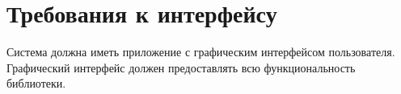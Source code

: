 \section{Требования к интерфейсу}
Система должна иметь приложение с графическим интерфейсом пользователя. Графический интерфейс должен предоставлять всю функциональность библиотеки.
